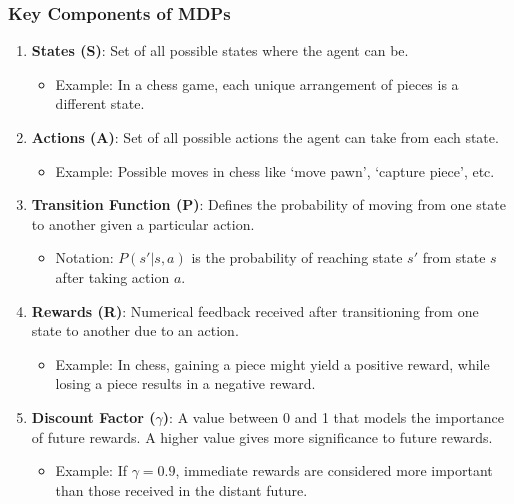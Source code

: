 \documentclass[aspectratio=169]{beamer}
\begin{document}
\begin{frame}[fragile]
    \frametitle{Key Components of MDPs}
    \begin{enumerate}
        \item \textbf{States (S)}: Set of all possible states where the agent can be. 
        \begin{itemize}
            \item Example: In a chess game, each unique arrangement of pieces is a different state.
        \end{itemize}
        
        \item \textbf{Actions (A)}: Set of all possible actions the agent can take from each state. 
        \begin{itemize}
            \item Example: Possible moves in chess like ‘move pawn’, ‘capture piece’, etc.
        \end{itemize}
        
        \item \textbf{Transition Function (P)}: Defines the probability of moving from one state to another given a particular action.
        \begin{itemize}
            \item Notation: \( P(s'|s,a) \) is the probability of reaching state \( s' \) from state \( s \) after taking action \( a \).
        \end{itemize}
        
        \item \textbf{Rewards (R)}: Numerical feedback received after transitioning from one state to another due to an action.
        \begin{itemize}
            \item Example: In chess, gaining a piece might yield a positive reward, while losing a piece results in a negative reward.
        \end{itemize}
        
        \item \textbf{Discount Factor (\(\gamma\))}: A value between 0 and 1 that models the importance of future rewards. A higher value gives more significance to future rewards.
        \begin{itemize}
            \item Example: If \( \gamma = 0.9 \), immediate rewards are considered more important than those received in the distant future.
        \end{itemize}
    \end{enumerate}
\end{frame}
\end{document}

